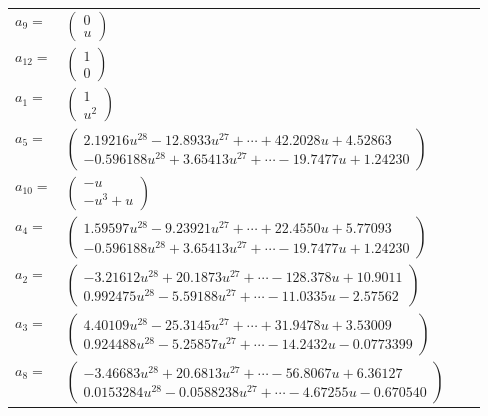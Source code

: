 \documentclass[1p]{elsarticle_modified}
\theoremstyle{definition}
\begin{document}
\begin{tabular}{m{7pt} m{180pt} m{7pt} m{180pt} }
\flushright $a_{9}=$&$\begin{pmatrix}0\\u\end{pmatrix}$ \\
\flushright $a_{12}=$&$\begin{pmatrix}1\\0\end{pmatrix}$ \\
\flushright $a_{1}=$&$\begin{pmatrix}1\\u^2\end{pmatrix}$ \\
\flushright $a_{5}=$&$\begin{pmatrix}2.19216 u^{28}-12.8933 u^{27}+\cdots+42.2028 u+4.52863\\-0.596188 u^{28}+3.65413 u^{27}+\cdots-19.7477 u+1.24230\end{pmatrix}$ \\
\flushright $a_{10}=$&$\begin{pmatrix}- u\\- u^3+u\end{pmatrix}$ \\
\flushright $a_{4}=$&$\begin{pmatrix}1.59597 u^{28}-9.23921 u^{27}+\cdots+22.4550 u+5.77093\\-0.596188 u^{28}+3.65413 u^{27}+\cdots-19.7477 u+1.24230\end{pmatrix}$ \\
\flushright $a_{2}=$&$\begin{pmatrix}-3.21612 u^{28}+20.1873 u^{27}+\cdots-128.378 u+10.9011\\0.992475 u^{28}-5.59188 u^{27}+\cdots-11.0335 u-2.57562\end{pmatrix}$ \\
\flushright $a_{3}=$&$\begin{pmatrix}4.40109 u^{28}-25.3145 u^{27}+\cdots+31.9478 u+3.53009\\0.924488 u^{28}-5.25857 u^{27}+\cdots-14.2432 u-0.0773399\end{pmatrix}$ \\
\flushright $a_{8}=$&$\begin{pmatrix}-3.46683 u^{28}+20.6813 u^{27}+\cdots-56.8067 u+6.36127\\0.0153284 u^{28}-0.0588238 u^{27}+\cdots-4.67255 u-0.670540\end{pmatrix}$ \\

\end{tabular}
\end{document}
